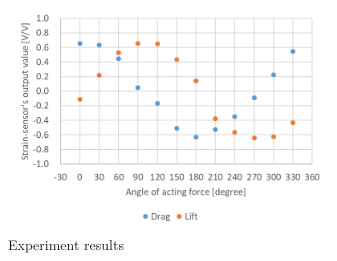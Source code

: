 \documentclass[twocolumn,a4j]{jsarticle}
\begin{document}
\newpage

\begin{figure}[htbp]
    \footnotesize
    \begin{center}
        \includegraphics[width=85mm]{../../2111/images/experiment_results.png}
        \caption{Experiment results}
    \end{center}
\end{figure}
\end{document}
